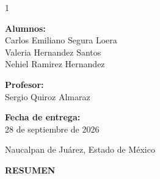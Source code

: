 \documentclass[12pt,letterpaper]{article}
\begin{document}
\begin{titlepage}
\begin{spacing}{1}
\vspace{2.2cm}

\begin{flushright}

\begin{minipage}{0.58\textwidth}

\textbf{Alumnos:}\\[0.15cm]
Carlos Emiliano Segura Loera\\
Valeria Hernandez Santos\\
Nehiel Ramirez Hernandez 

\vspace{0.5cm}

\textbf{Profesor:}\\[0.1cm]
Sergio Quiroz Almaraz

\vspace{0.5cm}

\textbf{Fecha de entrega:}\\[0.1cm]
28 de septiembre de 2026

\vspace{0.5cm}

Naucalpan de Juárez, Estado de México

\end{minipage}

\end{flushright}

\end{spacing}

\end{titlepage}


\setcounter{page}{1}


\tableofcontents

\clearpage


{}

\begin{center}

{\large\bfseries
RESUMEN
}

\end{center}
\end{document}
